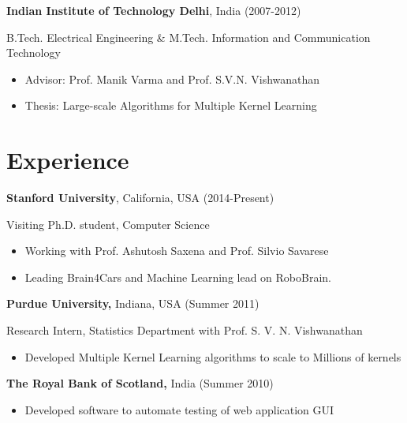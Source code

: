 \documentclass[line,margin]{res}
\begin{document}
\begin{resume}
 {\bf Indian Institute of Technology Delhi}, India  \hfill (2007-2012)
   
 \vspace{-4mm}
  \hspace {4mm } B.Tech. Electrical Engineering \& M.Tech. Information
and Communication Technology
 \begin{itemize} \itemsep -2pt  %
 \item Advisor: Prof. Manik Varma and Prof. S.V.N. Vishwanathan
 \item Thesis: Large-scale Algorithms for Multiple Kernel Learning
 \end{itemize}

\section{Experience}

{\bf Stanford University}, California, USA  \hfill (2014-Present)
 
 \vspace{-4mm}
  \hspace {4mm } Visiting Ph.D. student, Computer Science 
 \begin{itemize} \itemsep -2pt  %
 \item Working with Prof. Ashutosh Saxena and Prof. Silvio Savarese
 \item Leading Brain4Cars and Machine Learning lead on RoboBrain.
 \end{itemize}

{\bf Purdue University,} Indiana, USA \hfill (Summer 2011)
    
 \vspace{-3mm}
  \hspace {4mm }Research Intern, Statistics Department with Prof. S. V. N. Vishwanathan
 \begin{itemize} \itemsep -2pt  %
 \item Developed Multiple Kernel Learning algorithms to scale to Millions of
kernels
 \end{itemize}

{\bf The Royal Bank of Scotland,} India  \hfill  (Summer 2010)
   

\begin{itemize} \itemsep -2pt 
\item Developed software to automate testing of web application GUI
\end{itemize}



\end{resume}
\end{document}
